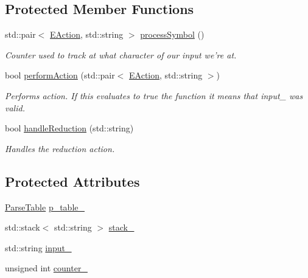 \subsection*{\-Protected \-Member \-Functions}
\begin{DoxyCompactItemize}
\item 
std\-::pair$<$ \hyperlink{namespaceparser_a7a838229f5b5b20f185dfad9d362dbed}{\-E\-Action}, std\-::string $>$ \hyperlink{classparser_1_1LRParser_ac9e3368e99728ed520337590ca04871b}{process\-Symbol} ()
\begin{DoxyCompactList}\small\item\em \-Counter used to track at what character of our input we're at. \end{DoxyCompactList}\item 
bool \hyperlink{classparser_1_1LRParser_a4999e6f888dd298d99ad945f95f1b9b6}{perform\-Action} (std\-::pair$<$ \hyperlink{namespaceparser_a7a838229f5b5b20f185dfad9d362dbed}{\-E\-Action}, std\-::string $>$)
\begin{DoxyCompactList}\small\item\em \-Performs action. \-If this evaluates to true the function it means that input\-\_\- was valid. \end{DoxyCompactList}\item 
bool \hyperlink{classparser_1_1LRParser_a1752e1adccefa9865a327eb4b0554103}{handle\-Reduction} (std\-::string)
\begin{DoxyCompactList}\small\item\em \-Handles the reduction action. \end{DoxyCompactList}\end{DoxyCompactItemize}
\subsection*{\-Protected \-Attributes}
\begin{DoxyCompactItemize}
\item 
\hyperlink{classparser_1_1ParseTable}{\-Parse\-Table} \hyperlink{classparser_1_1LRParser_a2d47acce2ed64522ddd4011295412e72}{p\-\_\-table\-\_\-}
\item 
std\-::stack$<$ std\-::string $>$ \hyperlink{classparser_1_1LRParser_a6e3689c510e91dbc51a2bee92bf760da}{stack\-\_\-}
\item 
std\-::string \hyperlink{classparser_1_1LRParser_a7d693202c661afc170b2c5cc11667323}{input\-\_\-}
\item 
unsigned int \hyperlink{classparser_1_1LRParser_accf01c8956117b364f88fba4cb17b15c}{counter\-\_\-}
\end{DoxyCompactItemize}
